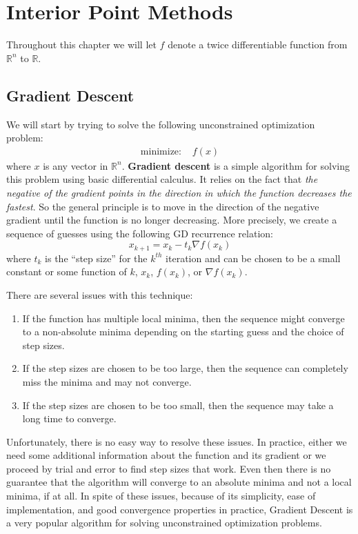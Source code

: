\documentclass[
]{book}
\providecommand{\tightlist}{%
  \setlength{\itemsep}{0pt}\setlength{\parskip}{0pt}}
\theoremstyle{definition}
\theoremstyle{definition}
\theoremstyle{definition}
\theoremstyle{definition}
\theoremstyle{remark}
\begin{document}
\hypertarget{interior-point-methods}{%
\chapter{Interior Point Methods}\label{interior-point-methods}}

Throughout this chapter we will let \(f\) denote a twice differentiable function from \(\mathbb{R}^n\) to \(\mathbb{R}\).

\hypertarget{gradient-descent}{%
\section{Gradient Descent}\label{gradient-descent}}

We will start by trying to solve the following unconstrained optimization problem:
\begin{align*}
  \mbox{minimize: } & f(x)
\end{align*}
where \(x\) is any vector in \(\mathbb{R}^n\).
\textbf{Gradient descent} is a simple algorithm for solving this problem using basic differential calculus.
It relies on the fact that \emph{the negative of the gradient points in the direction in which the function decreases the fastest}.
So the general principle is to move in the direction of the negative gradient until the function is no longer decreasing.
More precisely, we create a sequence of guesses using the following GD recurrence relation:
\[x_{k+1} = x_k - t_k \nabla f(x_k)\]
where \(t_k\) is the ``step size'' for the \(k^{th}\) iteration and can be chosen to be a small constant or some function of \(k\), \(x_k\), \(f(x_k)\), or \(\nabla f(x_k)\).

There are several issues with this technique:

\begin{enumerate}
\def\labelenumi{\arabic{enumi}.}
\tightlist
\item
  If the function has multiple local minima, then the sequence might converge to a non-absolute minima depending on the starting guess and the choice of step sizes.
\item
  If the step sizes are chosen to be too large, then the sequence can completely miss the minima and may not converge.
\item
  If the step sizes are chosen to be too small, then the sequence may take a long time to converge.
\end{enumerate}

Unfortunately, there is no easy way to resolve these issues. In practice, either we need some additional information about the function and its gradient or we proceed by trial and error to find step sizes that work. Even then there is no guarantee that the algorithm will converge to an absolute minima and not a local minima, if at all. In spite of these issues, because of its simplicity, ease of implementation, and good convergence properties in practice, Gradient Descent is a very popular algorithm for solving unconstrained optimization problems.
\end{document}
